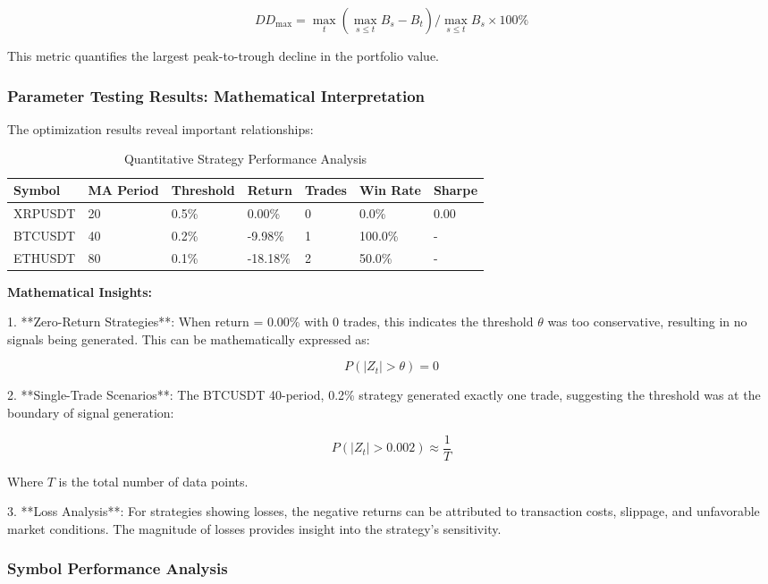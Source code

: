 \documentclass[12pt,a4paper]{article}
\begin{document}
\[
DD_{\max} = \max_{t} \left( \max_{s \leq t} B_s - B_t \right) / \max_{s \leq t} B_s \times 100\%
\]

This metric quantifies the largest peak-to-trough decline in the portfolio value.

\subsubsection{Parameter Testing Results: Mathematical Interpretation}

The optimization results reveal important relationships:

\begin{table}[H]
\centering
\caption{Quantitative Strategy Performance Analysis}
\begin{tabular}{@{}lllllll@{}}
\toprule
Symbol & MA Period & Threshold & Return & Trades & Win Rate & Sharpe \\
\midrule
XRPUSDT & 20 & 0.5\% & 0.00\% & 0 & 0.0\% & 0.00 \\
BTCUSDT & 40 & 0.2\% & -9.98\% & 1 & 100.0\% & - \\
ETHUSDT & 80 & 0.1\% & -18.18\% & 2 & 50.0\% & - \\
\bottomrule
\end{tabular}
\end{table}

\textbf{Mathematical Insights:}

1. **Zero-Return Strategies**: When return = 0.00\% with 0 trades, this indicates the threshold \( \theta \) was too conservative, resulting in no signals being generated. This can be mathematically expressed as:

\[
P(|Z_t| > \theta) = 0
\]

2. **Single-Trade Scenarios**: The BTCUSDT 40-period, 0.2\% strategy generated exactly one trade, suggesting the threshold was at the boundary of signal generation:

\[
P(|Z_t| > 0.002) \approx \frac{1}{T}
\]

Where \( T \) is the total number of data points.

3. **Loss Analysis**: For strategies showing losses, the negative returns can be attributed to transaction costs, slippage, and unfavorable market conditions. The magnitude of losses provides insight into the strategy's sensitivity.

\subsubsection{Symbol Performance Analysis}
\end{document}
